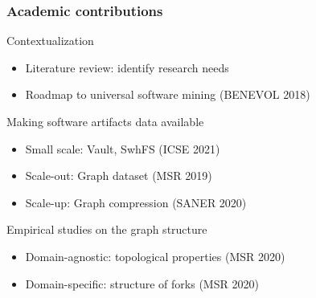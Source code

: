 \documentclass[aspectratio=169,xcolor=table]{beamer}
\begin{document}
    \begin{frame}
        \frametitle{Academic contributions}

        \begin{block}{Contextualization}
            \begin{itemize}
                \item Literature review: identify research needs
                \item Roadmap to universal software mining (BENEVOL 2018)
            \end{itemize}
        \end{block}

        \begin{block}{Making software artifacts data available}
            \begin{itemize}
                \item Small scale: Vault, SwhFS (ICSE 2021)
                \item Scale-out: Graph dataset (MSR 2019)
                \item Scale-up: Graph compression (SANER 2020)
            \end{itemize}
        \end{block}

        \begin{block}{Empirical studies on the graph structure}
            \begin{itemize}
                \item Domain-agnostic: topological properties (MSR 2020)
                \item Domain-specific: structure of forks (MSR 2020)
            \end{itemize}
        \end{block}
    \end{frame}

\end{document}
